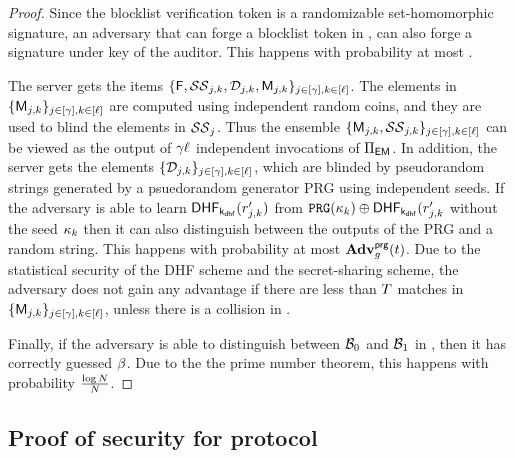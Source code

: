 \begin{proof}

Since the blocklist verification token is a randomizable set-homomorphic signature, an adversary that can forge a blocklist token in \unforgeBlocklistExp, can also forge a signature under key of the auditor. This happens with probability at most \ufcmaAdv. 

The server gets the items $\{\cOutputFile, \ssSet_{\projIdx, \vecIdx}, \dhfSet_{\projIdx, \vecIdx}, \cOutputMeta{\projIdx, \vecIdx}\}_{\projIdx \in \nats[\numProjections], \vecIdx \in \nats[\genericVecLen]}$. The elements in $\{\cOutputMeta{\projIdx, \vecIdx}\}_{\projIdx \in \nats[\numProjections], \vecIdx \in \nats[\genericVecLen]}$ are computed using independent random coins, and they are used to blind the elements in $\ssSet_{\projIdx}$. Thus the ensemble $\{\cOutputMeta{\projIdx, \vecIdx}, \ssSet_{\projIdx, \vecIdx} \}_{\projIdx \in \nats[\numProjections], \vecIdx \in \nats[\genericVecLen]}$ can be viewed as 
the output of $\gamma \ell$ 	independent invocations of 
$\Pi_{\mathsf{EM}}$. In addition, the server gets the elements $\{  \dhfSet_{\projIdx, \vecIdx} \}_{\projIdx \in \nats[\numProjections], \vecIdx \in \nats[\genericVecLen]}$, which are blinded by pseudorandom strings generated by a psuedorandom generator PRG using independent seeds. 
If the adversary is able to learn $\dhf[\dhfKey](\genericRandAlt[\projIdx, \vecIdx])$ from $\prg(\genericSymmKey_\vecIdx) \oplus \dhf[\dhfKey](\genericRandAlt[\projIdx, \vecIdx]$ without the seed $\kappa_k$ then it can also distinguish between the outputs of the PRG and a random string. This happens with probability at most $\Advantage{\prgLabel}{\genericFnFamily}(\timeBound)$. 
Due to the statistical security of the DHF scheme and the secret-sharing scheme, the adversary does not gain any advantage if there are less than $T$ matches in 
$\{\cOutputMeta{\projIdx, \vecIdx}\}_{\projIdx \in \nats[\numProjections], \vecIdx \in \nats[\genericVecLen]}$, unless there is a collision in \primeRO. 


Finally, if the adversary is able to distinguish between $\blocklist_0$ and $\blocklist_1$ in \hidingBlocklistExp, then it has correctly guessed $\beta$. Due to the the prime number theorem, this happens with probability $\frac{\log N}{N}$.

\end{proof}


\subsection{Proof of security for protocol \protocolEMP}
\label{sec:proof:emp}
%

